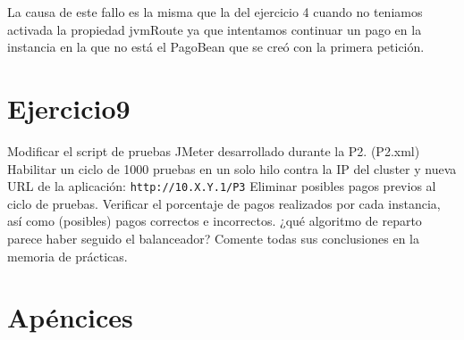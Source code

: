 \documentclass[a4paper, 10pt]{article}
\begin{document}
La causa de este fallo es la misma que la del ejercicio 4 cuando no teniamos activada la propiedad jvmRoute ya que intentamos continuar un pago en la instancia en la que no está el PagoBean que se creó con la primera petición.

\section{Ejercicio9}
\begin{mdframed}
	Modificar el script de pruebas JMeter desarrollado durante la P2. (P2.xml) Habilitar un ciclo de
	1000 pruebas en un solo hilo contra la IP del cluster y nueva URL de la aplicación:
	\texttt{http://10.X.Y.1/P3}
	Eliminar posibles pagos previos al ciclo de pruebas. Verificar el porcentaje de pagos realizados por cada
	instancia, así como (posibles) pagos correctos e incorrectos. ¿qué algoritmo de reparto parece haber
	seguido el balanceador? Comente todas sus conclusiones en la memoria de prácticas. 
\end{mdframed}

\newpage
\appendix
\section{Apéncices}
\end{document}

